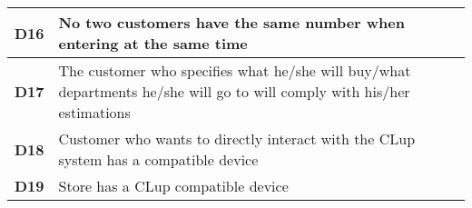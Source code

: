 \begin{center}
{\begin{longtable}{L{2cm}L{12cm}}
            \hline
            \textbf{D16} & No two customers have the same number when entering at the same time \\
            \hline
            \textbf{D17} & The customer who specifies what he/she will buy/what departments he/she will go to will comply with his/her estimations \\
            \hline
            \textbf{D18} & Customer who wants to directly interact with the CLup system has a compatible device \\
            \hline
            \textbf{D19} & Store has a CLup compatible device \\
            \hline
        \end{longtable}}
    \end{center}